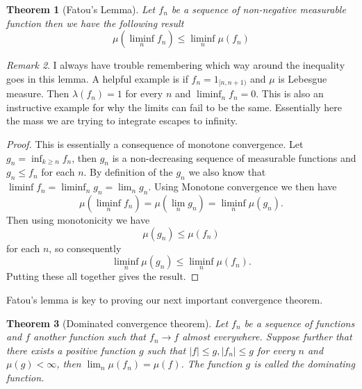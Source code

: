 \documentclass[11pt]{article}
\newtheorem{thm}{Theorem}[section]
\theoremstyle{definition}
\theoremstyle{remark}
\newtheorem{remark}[thm]{Remark}
\begin{document}
\begin{thm}[Fatou's Lemma]
Let $f_n$ be a sequence of non-negative measurable function then we have the following result
\[ \mu \left( \liminf_n f_n \right) \leq \liminf_n \mu(f_n) \]
\end{thm}
\begin{remark}
I always have trouble remembering which way around the inequality goes in this lemma. A helpful example is if $f_n = 1_{[n,n+1)}$ and $\mu$ is Lebesgue measure. Then $\lambda(f_n) = 1$ for every $n$ and $\liminf_n f_n = 0$. This is also an instructive example for why the limits can fail to be the same. Essentially here the mass we are trying to integrate escapes to infinity.
\end{remark}
\begin{proof}
This is essentially a consequence of monotone convergence. Let $g_n = \inf_{k \geq n} f_n$, then $g_n$ is a non-decreasing sequence of measurable functions and $g_n \leq f_n$ for each $n$. By definition of the $g_n$ we also know that $\liminf f_n = \liminf_n g_n = \lim_n g_n$. Using Monotone convergence we then have
\[ \mu(\liminf_n f_n) = \mu(\lim_n g_n) = \liminf_n \mu(g_n). \] Then using monotonicity we have
\[ \mu(g_n) \leq \mu(f_n) \] for each $n$, so consequently
\[ \liminf_n \mu(g_n) \leq \liminf_n \mu(f_n). \] Putting these all together gives the result. 
\end{proof}
Fatou's lemma is key to proving our next important convergence theorem.
\begin{thm}[Dominated convergence theorem]
Let $f_n$ be a sequence of functions and $f$ another function such that $f_n \rightarrow f$ almost everywhere. Suppose further that there exists a positive function $g$ such that $|f| \leq g, |f_n| \leq g$ for every $n$ and $\mu(g) < \infty$, then $\lim_n \mu(f_n) = \mu(f)$. The function $g$ is called the \emph{dominating function}.
\end{thm}
\end{document}

